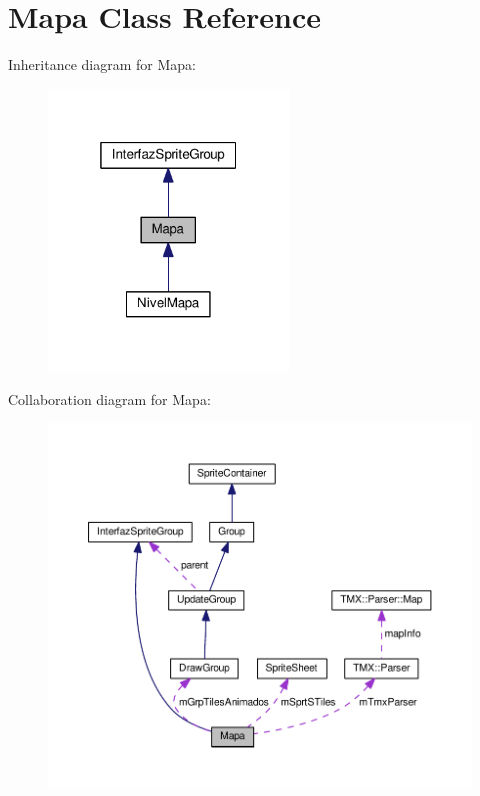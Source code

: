 \hypertarget{class_mapa}{}\section{Mapa Class Reference}
\label{class_mapa}


Inheritance diagram for Mapa\+:
\nopagebreak
\begin{figure}[H]
\begin{center}
\leavevmode
\includegraphics[width=181pt]{class_mapa__inherit__graph}
\end{center}
\end{figure}


Collaboration diagram for Mapa\+:
\nopagebreak
\begin{figure}[H]
\begin{center}
\leavevmode
\includegraphics[width=350pt]{class_mapa__coll__graph}
\end{center}
\end{figure}
